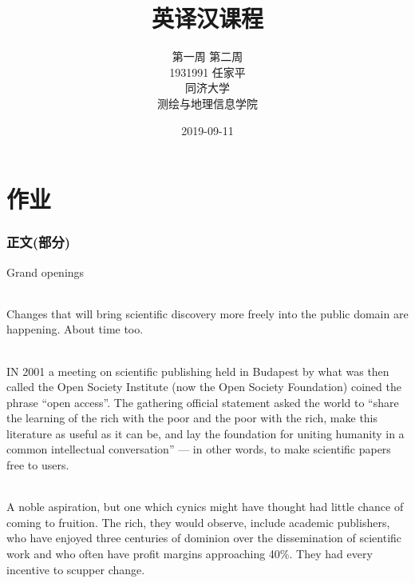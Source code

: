 \documentclass[a4paper, 12pt, UTF8]{article}
\begin{document}
\title{\Huge 英译汉课程}
\author{\Large 
        第一周 第二周 \\[12pt]
        1931991 任家平 \\[12pt]
        同济大学 \\[12pt]
        测绘与地理信息学院}
\date{2019-09-11}
\maketitle

\thispagestyle{empty}

\newpage
{}
\tableofcontents
{}

\newpage
{}
\part{作业}

\newpage
\section{正文(部分)}

\begin{bfseries}
    \Large 
    Grand openings
    \paragraph*{}
    \large
    Changes that will bring scientific discovery more freely into the public domain are happening. About time too.
\end{bfseries}

\paragraph*{}
    IN 2001 a meeting on scientific publishing held in Budapest by what was then called the Open Society Institute (now the Open Society Foundation) coined the phrase “open access”. The gathering official statement asked the world to “share the learning of the rich with the poor and the poor with the rich, make this literature as useful as it can be, and lay the foundation for uniting humanity in a common intellectual conversation” --- in other words, to make scientific papers free to users.

\paragraph*{}
    A noble aspiration, but one which cynics might have thought had little chance of coming to fruition. The rich, they would observe, include academic publishers, who have enjoyed three centuries of dominion over the dissemination of scientific work and who often have profit margins approaching 40\%. They had every incentive to scupper change.
\end{document}

